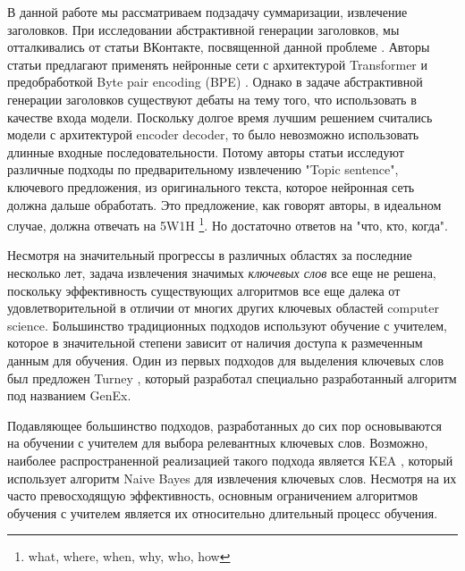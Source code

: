 \documentclass[14pt]{matmex-diploma-custom}
\begin{document}
В данной работе мы рассматриваем подзадачу суммаризации, извлечение заголовков. При исследовании абстрактивной генерации заголовков, мы отталкивались от статьи ВКонтакте, посвященной данной проблеме \cite{gavrilov2018self}. Авторы статьи предлагают применять нейронные сети с архитектурой Transformer и предобработкой Byte pair encoding (BPE) \cite{DBLP:journals/corr/SennrichHB15}. Однако в задаче абстрактивной генерации заголовков существуют дебаты на тему того, что использовать в качестве входа модели. Поскольку долгое время лучшим решением считались модели с архитектурой encoder decoder, то было невозможно использовать длинные входные последовательности. Потому авторы статьи \cite{Putra2018IncorporatingTS} исследуют различные подходы по предварительному извлечению "Topic sentence", ключевого предложения, из оригинального текста, которое нейронная сеть должна дальше обработать. Это предложение, как говорят авторы, в идеальном случае, должна отвечать на 5W1H \footnote{what, where, when, why, who, how}. Но достаточно ответов на "что, кто, когда".



Несмотря на значительный прогрессы в различных областях за последние несколько лет, задача извлечения значимых \textit{ключевых слов} все еще не решена, поскольку эффективность существующих алгоритмов все еще далека от удовлетворительной в отличии от многих других ключевых областей computer science. Большинство традиционных подходов используют обучение с учителем, которое в значительной степени зависит от наличия доступа к размеченным данным для обучения. Один из первых подходов для выделения ключевых слов был предложен Turney \cite{Turney2000LearningAF}, который разработал специально разработанный алгоритм под названием GenEx.

Подавляющее большинство подходов, разработанных до сих пор основываются на обучении с учителем для выбора релевантных ключевых слов. Возможно, наиболее распространенной реализацией такого подхода является KEA \cite{Witten:1999:KPA:313238.313437}, который использует алгоритм Naive Bayes для извлечения ключевых слов. Несмотря на их часто превосходящую эффективность, основным ограничением алгоритмов обучения с учителем является их относительно длительный процесс обучения.
\end{document}
